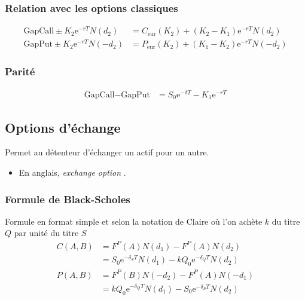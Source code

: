 \documentclass[10pt, french]{article}
\begin{document}
\begin{multicols*}{2}
\subsubsection*{Relation avec les options classiques}
\begin{align*}
	\text{GapCall}	\pm	K_{2}\textrm{e}^{-rT} N(d_{2})
	&=	C_{\text{eur}}(K_{2})	+	(K_{2}	-	K_{1})\textrm{e}^{-rT} N(d_{2})	\\
	\text{GapPut}	\pm	K_{2}\textrm{e}^{-rT} N(-d_{2})
	&=	P_{\text{eur}}(K_{2})	+	(K_{1}	-	K_{2})\textrm{e}^{-rT} N(-d_{2})
\end{align*}

\subsubsection*{Parité}
\begin{align*}
	\text{GapCall}	-	\text{GapPut}
	&=	S_{0}\textrm{e}^{-\delta T}	-	K_{1}\textrm{e}^{-rT}
\end{align*}

\columnbreak
\subsection{Options d'échange}
\begin{definitionNOHFILL}
Permet au détenteur d'échanger un actif pour un autre.

\tcbline

\begin{itemize}[leftmargin = *]
	\item	En anglais, \og \textit{exchange option} \fg{}.
\end{itemize}
\end{definitionNOHFILL}

\subsubsection*{Formule de Black-Scholes}
Formule en format simple et selon la notation de Claire où l'on achète $k$ du titre $Q$ par unité du titre $S$
\begin{align*}
	C(A, B)
	&=	F^{P}(A)N(d_{1})	-	F^{P}(A)N(d_{2})	\\
	&=	S_{0} \textrm{e}^{-\delta_{S}T}N(d_{1})	-	kQ_{0} \textrm{e}^{-\delta_{Q}T}N(d_{2})	\\
	P(A, B)
	&=	F^{P}(B)N(-d_{2})	-	F^{P}(A)N(-d_{1})	\\
	&=	kQ_{0} \textrm{e}^{-\delta_{Q}T}N(d_{1})	-	S_{0} \textrm{e}^{-\delta_{S}T}N(d_{2})	\\	
\end{align*}


\end{multicols*}
\end{document}
